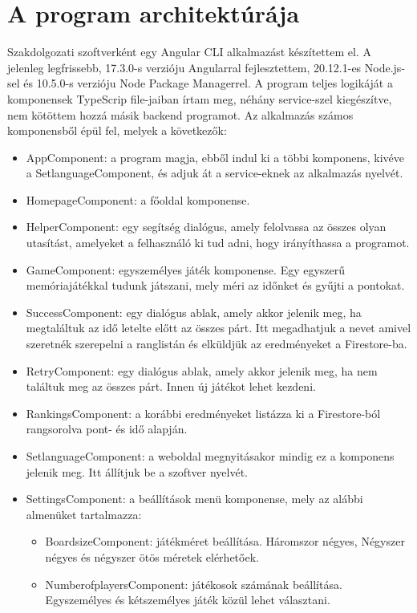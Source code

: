 \documentclass[12pt]{report}
\begin{document}
\section{A program architektúrája}
Szakdolgozati szoftverként egy Angular CLI alkalmazást készítettem el. A jelenleg legfrissebb, 17.3.0-s verzióju Angularral fejlesztettem, 20.12.1-es Node.js-sel és 10.5.0-s verzióju Node Package Managerrel. A program teljes logikáját a komponensek TypeScrip file-jaiban írtam meg, néhány service-szel kiegészítve, nem kötöttem hozzá másik backend programot.
\newline
Az alkalmazás számos komponensből épül fel, melyek a következők:
\begin{itemize}
    \item AppComponent: a program magja, ebből indul ki a többi komponens, kivéve a SetlanguageComponent, és adjuk át a service-eknek az alkalmazás nyelvét.
    \item HomepageComponent: a főoldal komponense.
    \item HelperComponent: egy segítség dialógus, amely felolvassa az összes olyan utasítást, amelyeket a felhasználó ki tud adni, hogy irányíthassa a programot.
    \item GameComponent: egyszemélyes játék komponense. Egy egyszerű memóriajátékkal tudunk játszani, mely méri az időnket és gyűjti a pontokat.
    \item SuccessComponent: egy dialógus ablak, amely akkor jelenik meg, ha megtaláltuk az idő letelte előtt az összes párt. Itt megadhatjuk a nevet amivel szeretnék szerepelni a ranglistán és elküldjük az eredményeket a Firestore-ba.
    \item RetryComponent: egy dialógus ablak, amely akkor jelenik meg, ha nem találtuk meg az összes párt. Innen új játékot lehet kezdeni.
    \item RankingsComponent: a korábbi eredményeket listázza ki a Firestore-ból rangsorolva pont- és idő alapján.
    \item SetlanguageComponent: a weboldal megnyitásakor mindig ez a komponens jelenik meg. Itt állítjuk be a szoftver nyelvét.
    \item SettingsComponent: a beállítások menü komponense, mely az alábbi almenüket tartalmazza:
    \begin{itemize}
        \item BoardsizeComponent: játékméret beállítása. Háromszor négyes, Négyszer négyes és négyszer ötös méretek elérhetőek.
        \item NumberofplayersComponent: játékosok számának beállítása. Egyszemélyes és kétszemélyes játék közül lehet választani.

\end{itemize}
\end{itemize}
\end{document}

